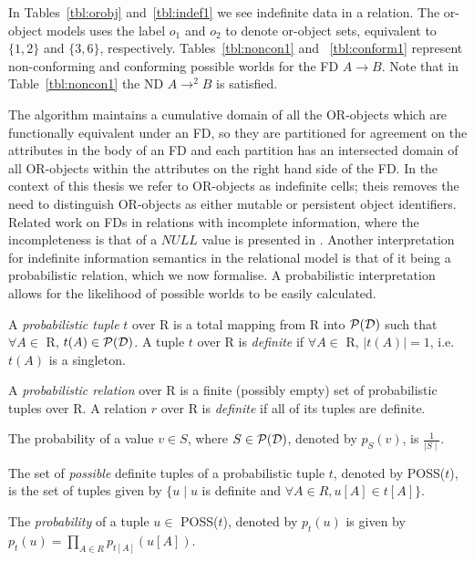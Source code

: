 In Tables~\ref{tbl:orobj} and~\ref{tbl:indef1} we see indefinite data
in a relation. The or-object models uses the label $o_1$ and $o_2$ to
denote or-object sets, equivalent to $\{1,2\}$ and $\{3,6\}$,
respectively. Tables~\ref{tbl:noncon1} and ~\ref{tbl:conform1}
represent non-conforming and conforming possible worlds for the FD $A
\to B$. Note that in Table~\ref{tbl:noncon1} the ND $A \to^2 B$ is satisfied.

The algorithm maintains a cumulative domain of all the OR-objects which
are functionally equivalent under an FD, so they are partitioned for
agreement on the attributes in the body of an FD and each partition
has an intersected domain of all OR-objects within the attributes
on the right hand side of the FD. In the context of this thesis we
refer to OR-objects as indefinite cells; theis removes the need to
distinguish OR-objects as either mutable or persistent object identifiers.\\

Related
work on FDs in relations with incomplete information, where
the incompleteness is that of a $NULL$ value is presented in
\cite{ll98,lv97}. 
Another interpretation for indefinite information semantics in the
relational model is that of it being a probabilistic relation, which
we now formalise. A probabilistic interpretation allows for the
likelihood of possible worlds to be easily calculated.


\begin{definition}
\begin{rm}
A {\em probabilistic tuple} $t$ over R 
is a total mapping from R into ${\cal P}({\cal D})$ 
such that $\forall A \in$ R, $t(A) \in {\cal P}({\cal D})$.
A tuple $t$ over R is {\em definite} if 
$\forall A \in$ R, $\mid t(A) \mid = 1$, i.e. $t(A)$ is a singleton.

\smallskip

A {\em probabilistic relation} over R 
is a finite (possibly empty) set of probabilistic tuples over R.
A relation $r$ over R is {\em definite} if all of its tuples are definite.
\end{rm}
\end{definition}


\begin{definition}
\begin{rm}
The probability of a value $v \in S$, where  $S \in {\cal P}({\cal D})$,
denoted by $p_S(v)$, is $\frac{1}{\mid S \mid}$.

\smallskip

The set of {\em possible} definite tuples of a probabilistic tuple $t$, 
denoted by POSS($t$), is the set of tuples given by $\{u \mid u$ is
definite and $\forall A \in R, u[A] \in t[A]\}$.

\smallskip

The {\em probability} of a tuple $u \in$ POSS($t$), denoted by $p_t(u)$
is given by $p_t(u) = \prod_{A \in R} p_{t[A]}(u[A])$. 
\end{rm}
\end{definition}



